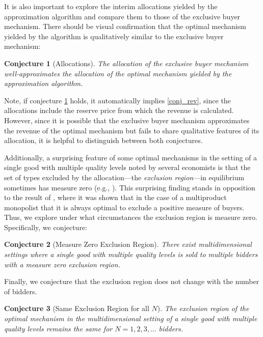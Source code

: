 \documentclass{article}
\newtheorem{conjecture}{Conjecture}
\begin{document}
It is also important to explore the interim allocations yielded by the approximation algorithm and compare them to those of the exclusive buyer mechanism. There should be visual confirmation that the optimal mechanism yielded by the algorithm is qualitatively similar to the exclusive buyer mechanism:

\begin{conjecture}[Allocations]\label{conj_alloc}
The allocation of the exclusive buyer mechanism well-approximates the allocation of the optimal mechanism yielded by the approximation algorithm.
\end{conjecture}

\noindent Note, if conjecture \ref{conj_alloc} holds, it automatically implies \ref{conj_rev}, since the allocations include the reserve price from which the revenue is calculated. However, since it is possible that the exclusive buyer mechanism approximates the revenue of the optimal mechanism but fails to share qualitative features of its allocation, it is helpful to distinguish between both conjectures.

Additionally, a surprising feature of some optimal mechanisms in the setting of a single good with multiple quality levels noted by several economists is that the set of types excluded by the allocation---the \textit{exclusion region}---in equilibrium sometimes has measure zero (e.g., \cite{thirumulanathan2019, belloni2010multidimensional}). This surprising finding stands in opposition to the result of \autocite{armstrong1996multiproduct}, where it was shown that in the case of a multiproduct monopolist that it is always optimal to exclude a positive measure of buyers. Thus, we explore under what circumstances the exclusion region is measure zero. Specifically, we conjecture:

\begin{conjecture}[Measure Zero Exclusion Region]\label{conj_excl_zero}
There exist multidimensional settings where a single good with multiple quality levels is sold to multiple bidders with a measure zero exclusion region.
\end{conjecture}

Finally, we conjecture that the exclusion region does not change with the number of bidders.

\begin{conjecture}[Same Exclusion Region for all $N$]\label{conj_excl_n}
The exclusion region of the optimal mechanism in the multidimensional setting of a single good with multiple quality levels remains the same for $N=1,2,3,\dots$ bidders. 
\end{conjecture}
\end{document}
